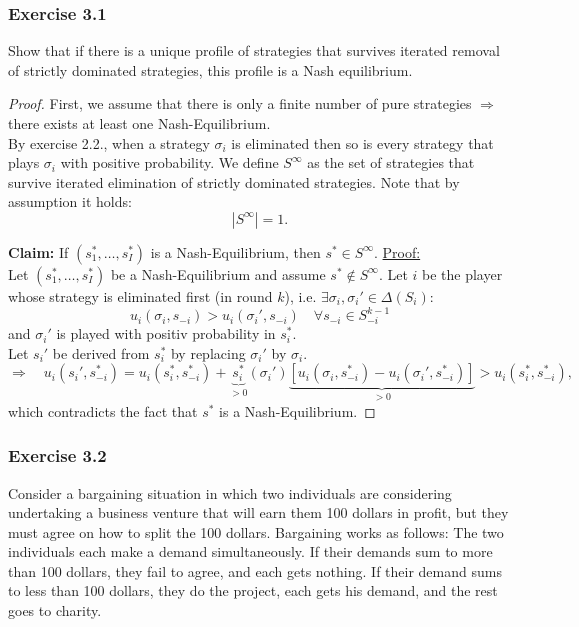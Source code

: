 \documentclass[12pt]{extreport} %
\theoremstyle{named}
\theoremstyle{itshape}
\theoremstyle{normal}
\begin{document}
\subsubsection*{Exercise 3.1}
	Show that if there is a unique profile of strategies that survives iterated removal of strictly dominated strategies, this profile is a Nash equilibrium.

	\begin{proof}
  		First, we assume that there is only a finite number of pure strategies $\Rightarrow$ there exists at least one Nash-Equilibrium. ~\\
  
  		By exercise 2.2., when a strategy $\sigma_{i}$ is eliminated then so is every strategy that plays $\sigma_{i}$ with positive probability. We define $S^{\infty}$ as the set of strategies that survive iterated elimination of strictly dominated strategies. Note that by assumption it holds:
  		$$ \left| S^{\infty} \right| = 1. $$
  
  \textbf{Claim:} If $\left(s_{1}^{*}, \dotsc, s_{I}^{*} \right)$ is a Nash-Equilibrium, then $s^{*} \in S^{\infty}$. \underline{Proof:} ~\\

  	Let $\left( s_{1}^{*}, \dotsc, s_{I}^{*} \right)$ be a Nash-Equilibrium and assume $s^{*} \notin S^{\infty}$. Let $i$ be the player whose strategy is eliminated first (in round $k$), i.e. $\exists \sigma_{i}, \sigma_{i}' \in \Delta\left(S_{i}\right)$:
  	$$ u_{i}(\sigma_{i}, s_{-i}) > u_{i}(\sigma_{i}', s_{-i}) \quad \forall s_{-i} \in S_{-i}^{k-1} $$
  	and $\sigma_{i}'$ is played with positiv probability in $s_{i}^{*}$. ~\\
  	
  	Let $s_{i}'$ be derived from $s_{i}^{*}$ by replacing $\sigma_{i}'$ by $\sigma_{i}$.
  	$$ \Rightarrow \quad u_{i}(s_{i}', s_{-i}^{*}) = u_{i}(s_{i}^{*},  s_{-i}^{*}) + \underbrace{s_{i}^{*}}_{> 0}(\sigma_{i}')\underbrace{\left[ u_{i}(\sigma_{i}, s_{-i}^{*}) - u_{i}(\sigma_{i}', s_{-i}^{*}) \right]}_{> 0}  > u_{i}(s_{i}^{*}, s_{-i}^{*}), $$
  which contradicts the fact that $s^{*}$ is a Nash-Equilibrium.
  \end{proof}
  
  
\subsubsection*{Exercise 3.2}


Consider a bargaining situation in which two individuals are considering undertaking a business venture that will earn them 100 dollars in profit, but they must agree on how to split the 100 dollars. Bargaining works as follows: The two individuals each make a demand simultaneously. If their demands sum to more than 100 dollars, they fail to agree, and each gets nothing. If their demand sums to less than 100 dollars, they do the project, each gets his demand, and the rest goes to charity.
\end{document}
